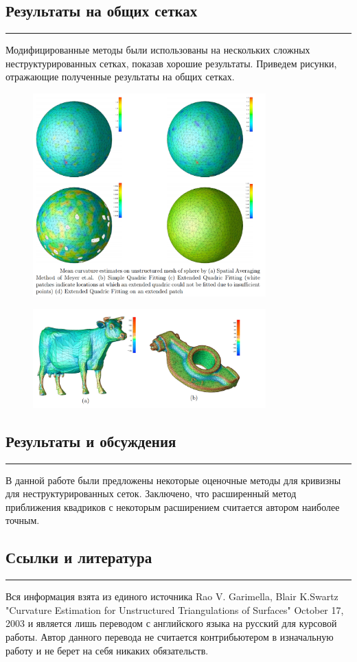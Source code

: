 \documentclass[12pt,a4paper, titlepage]{article}
\begin{document}
\subsection*{Результаты на общих сетках}
\noindent\rule{\textwidth}{1pt}
Модифицированные методы были использованы на нескольких сложных неструктурированных сетках, показав хорошие результаты. Приведем рисунки, отражающие полученные результаты на общих сетках.
\begin{figure}[H]
	\centering
	\includegraphics[width = 0.8\textwidth]{4.png}
\end{figure}
\begin{figure}[H]
	\centering
	\includegraphics[width = 0.8\textwidth]{5.png}
\end{figure}

\subsection*{Результаты и обсуждения}
\noindent\rule{\textwidth}{1pt}
В данной работе были предложены некоторые оценочные методы для кривизны для неструктурированных сеток. Заключено, что расширенный метод приближения квадриков с некоторым расширением считается автором наиболее точным.

\subsection*{Ссылки и литература}
\noindent\rule{\textwidth}{1pt}
Вся информация взята из единого источника Rao V. Garimella, Blair K.Swartz "Curvature Estimation for Unstructured Triangulations of Surfaces" October 17, 2003 и является лишь переводом с английского языка на русский для курсовой работы. Автор данного перевода не считается контрибьютером в изначальную работу и не берет на себя никаких обязательств.
\end{document}
